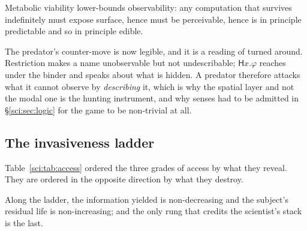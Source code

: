 \begin{corollary}
\label{sci:cor:conceal}
Metabolic viability lower-bounds observability: any computation that survives indefinitely must expose
surface, hence must be perceivable, hence is in principle predictable and so in principle edible.
\end{corollary}

The predator's counter-move is now legible, and it is a reading of \cite[Rem.~2]{ClassifierNote}
turned around. Restriction makes a name unobservable but not undescribable; $\mathsf{H}x.\varphi$
reaches under the binder and speaks about what is hidden. A predator therefore attacks what it cannot
observe by \emph{describing} it, which is why the spatial layer and not the modal one is the hunting
instrument, and why senses had to be admitted in \S\ref{sci:sec:logic} for the game to be non-trivial at
all.

\subsection{The invasiveness ladder}\label{sci:S9.2}

Table~\ref{sci:tab:access} ordered the three grades of access by what they reveal. They are ordered in the
opposite direction by what they destroy.

\begin{table}[h]
\centering
{}
\caption{Information gain and subject survival are in strict opposition, and only the fatal end of the
ladder pays.}
\label{sci:tab:ladder}
\end{table}

\begin{proposition}\label{sci:opposition-monotone}
Along the ladder, the information yielded is non-decreasing and the subject's residual life is
non-increasing; and the only rung that credits the scientist's stack is the last.
\end{proposition}

